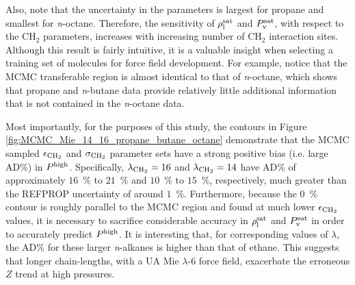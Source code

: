 \documentclass[preprint,letterpaper,floatfix,citeautoscript,aip,jcp]{revtex4-1}
\begin{document}
Also, note that the uncertainty in the parameters is largest for propane and smallest for \textit{n}-octane. Therefore, the sensitivity of $\rho_{\rm l}^{\rm sat}$ and $P_{\rm v}^{\rm sat}$, with respect to the CH$_2$ parameters, increases with increasing number of CH$_2$ interaction sites. Although this result is fairly intuitive, it is a valuable insight when selecting a training set of molecules for force field development. For example, notice that the MCMC transferable region is almost identical to that of \textit{n}-octane, which shows that propane and \textit{n}-butane data provide relatively little additional information that is not contained in the \textit{n}-octane data. 

Most importantly, for the purposes of this study, the contours in Figure \ref{fig:MCMC_Mie_14_16_propane_butane_octane} demonstrate that 
the MCMC sampled $\epsilon_{\rm CH_2}$ and $\sigma_{\rm CH_2}$ parameter sets have a strong positive bias (i.e. large AD\%) in $P^{\rm high}$. Specifically, $\lambda_{\rm CH_2} = 16$ and $\lambda_{\rm CH_2} = 14$ have AD\% of approximately $16$~\% to $21$~\% and $10$~\% to $15$~\%, respectively, much greater than the REFPROP uncertainty of around $1$~\%. 
Furthermore, because the 0~\% contour is roughly parallel to the MCMC region and found at much lower $\epsilon_{\rm CH_2}$ values, it is necessary to sacrifice considerable accuracy in $\rho_{\rm l}^{\rm sat}$ and $P_{\rm v}^{\rm sat}$ in order to accurately predict $P^{\rm high}$. 
It is interesting that, for corresponding values of $\lambda$, the AD\% for these larger \textit{n}-alkanes is higher than that of ethane. This suggests that longer chain-lengths, with a UA Mie $\lambda$-6 force field, exacerbate the erroneous $Z$ trend at high pressures.

\end{document}
